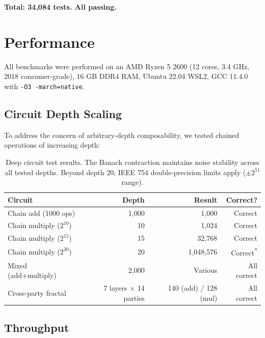 \documentclass[11pt,a4paper]{article}
\begin{document}
\textbf{Total: 34,084 tests. All passing.}

\section{Performance}
\label{sec:perf}

All benchmarks were performed on an AMD Ryzen 5 2600 (12 cores, 3.4 GHz, 2018 consumer-grade), 16 GB DDR4 RAM, Ubuntu 22.04 WSL2, GCC 11.4.0 with \texttt{-O3 -march=native}.

\subsection{Circuit Depth Scaling}

To address the concern of arbitrary-depth composability, we tested chained operations of increasing depth:

\begin{table}[h]
\centering
\begin{tabular}{@{}lrrr@{}}
\toprule
\textbf{Circuit} & \textbf{Depth} & \textbf{Result} & \textbf{Correct?} \\
\midrule
Chain add (1000 ops) & 1,000 & 1,000 & Correct \\
Chain multiply ($2^{10}$) & 10 & 1,024 & Correct \\
Chain multiply ($2^{15}$) & 15 & 32,768 & Correct \\
Chain multiply ($2^{20}$) & 20 & 1,048,576 & Correct\textsuperscript{*} \\
Mixed (add+multiply) & 2,000 & Various & All correct \\
Cross-party fractal & 7 layers $\times$ 14 parties & 140 (add) / 128 (mul) & All correct \\
\bottomrule
\end{tabular}
\caption{Deep circuit test results. The Banach contraction maintains noise stability across all tested depths. Beyond depth 20, IEEE 754 double-precision limits apply ($\pm 2^{51}$ range).}
\label{tab:depth}
\end{table}

\subsection{Throughput}
\end{document}
